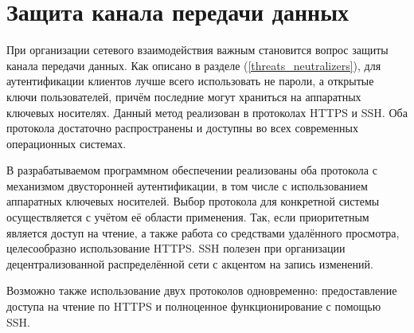 \section{Защита канала передачи данных} \label{technologic_network_security}

При организации сетевого взаимодействия важным становится вопрос защиты канала передачи данных.
Как описано в разделе (\ref{threats_neutralizers}), для аутентификации клиентов лучше всего использовать не пароли, а открытые ключи пользователей, причём последние могут храниться на аппаратных ключевых носителях.
Данный метод реализован в протоколах HTTPS и SSH.
Оба протокола достаточно распространены и доступны во всех современных операционных системах.

\vspace{\baselineskip}
В разрабатываемом программном обеспечении реализованы оба протокола с механизмом двусторонней аутентификации, в том числе с использованием аппаратных ключевых носителей.
Выбор протокола для конкретной системы осуществляется с учётом её области применения.
Так, если приоритетным является доступ на чтение, а также работа со средствами удалённого просмотра, целесообразно использование HTTPS.
SSH полезен при организации децентрализованной распределённой сети с акцентом на запись изменений.

\vspace{\baselineskip}
Возможно также использование двух протоколов одновременно: предоставление доступа на чтение по HTTPS и полноценное функционирование с помощью SSH.